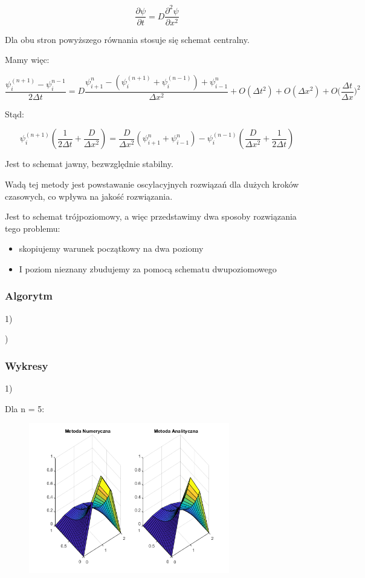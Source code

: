 $$\dfrac{\partial \psi}{\partial t} = D\dfrac{\partial^2 \psi}{\partial x^2}$$

Dla obu stron powyższego równania stosuje się schemat centralny.

Mamy więc:

$$\dfrac{\psi^{(n+1)}_{i}-\psi^{n-1}_{i}}{2\Delta t}=D\dfrac{\psi^{n}_{i+1}- \left( \psi^{(n+1)}_{i} + \psi^{(n-1)}_{i} \right)+\psi^n_{i-1}}{\Delta x^2} + O(\Delta t^2) + O(\Delta x^2) +  O\Big(\dfrac{\Delta t}{\Delta x}\Big)^2$$

Stąd:

$$\psi^{(n+1)}_{i} \left(\dfrac{1}{2 \Delta t} + \dfrac{D}{\Delta x^2}\right)= \dfrac{D}{\Delta x^2} \left( \psi^{n}_{i+1} + \psi^{n}_{i-1} \right) - \psi^{(n-1)}_{i} \left( \dfrac{D}{\Delta x^2} + \dfrac{1}{2\Delta t} \right) $$

Jest to schemat jawny, bezwzględnie stabilny. 

Wadą tej metody jest powstawanie oscylacyjnych rozwiązań dla dużych kroków czasowych, co wpływa na jakość rozwiązania.

Jest to schemat trójpoziomowy, a więc przedstawimy dwa sposoby rozwiązania tego problemu:
\begin{itemize}
	\item skopiujemy warunek początkowy na dwa poziomy
	\item I poziom nieznany zbudujemy za pomocą schematu dwupoziomowego
\end{itemize}

\newpage
\subsubsection{Algorytm}
1)

)

\newpage
\subsubsection{Wykresy}
1)

Dla n = 5:

\begin{figure}[!ht]
	\begin{center}
		\includegraphics[width=0.78\textwidth]{Lab7/charts/df/5.png}
	\end{center}
\end{figure}

